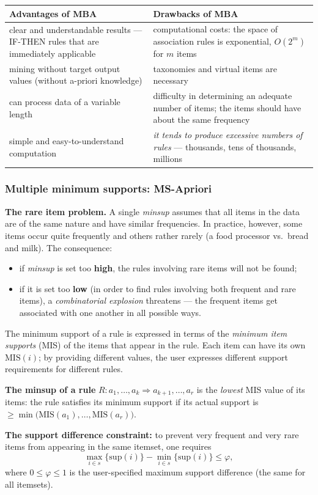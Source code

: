 \documentclass[11pt,a4paper]{article}
\theoremstyle{definition}
\begin{document}
\begin{center}
\small
\begin{tabular}{@{}p{7.6cm}p{8.0cm}@{}}
\toprule
\textbf{Advantages of MBA} & \textbf{Drawbacks of MBA} \\
\midrule
clear and understandable results --- IF-THEN rules that are immediately applicable &
  computational costs: the space of association rules is exponential, $O(2^m)$ for $m$ items \\
mining without target output values (without a-priori knowledge) & taxonomies and virtual items
  are necessary \\
can process data of a variable length & difficulty in determining an adequate number of items;
  the items should have about the same frequency \\
simple and easy-to-understand computation & \emph{it tends to produce excessive numbers of
  rules} --- thousands, tens of thousands, millions \\
\bottomrule
\end{tabular}
\end{center}

\subsubsection{Multiple minimum supports: MS-Apriori}

\textbf{The rare item problem.} A single \emph{minsup} assumes that all items in the data are of
the same nature and have similar frequencies. In practice, however, some items occur quite
frequently and others rather rarely (a food processor vs.\ bread and milk). The consequence:
\begin{itemize}
\item if \emph{minsup} is set too \textbf{high}, the rules involving rare items will not be
      found;
\item if it is set too \textbf{low} (in order to find rules involving both frequent and rare
      items), a \emph{combinatorial explosion} threatens --- the frequent items get associated
      with one another in all possible ways.
\end{itemize}

\begin{defbox}
The minimum support of a rule is expressed in terms of the \emph{minimum item supports} (MIS) of
the items that appear in the rule. Each item can have its own $\mathrm{MIS}(i)$; by providing
different values, the user expresses different support requirements for different rules.

\textbf{The minsup of a rule} $R: a_1,\dots,a_k\Rightarrow a_{k+1},\dots,a_r$ is the
\emph{lowest} MIS value of its items: the rule satisfies its minimum support if its actual
support is $\ge \min\big(\mathrm{MIS}(a_1),\dots,\mathrm{MIS}(a_r)\big)$.

\textbf{The support difference constraint:} to prevent very frequent and very rare items from
appearing in the same itemset, one requires
\[ \max_{i\in s}\{\mathrm{sup}(i)\}-\min_{i\in s}\{\mathrm{sup}(i)\}\le\varphi, \]
where $0\le\varphi\le 1$ is the user-specified maximum support difference (the same for all
itemsets).
\end{defbox}
\end{document}
